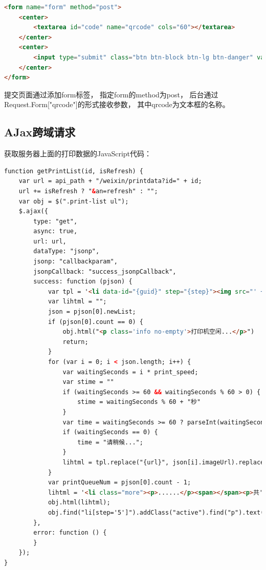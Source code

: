 \documentclass{book}
\begin{document}
\begin{lstlisting}[language=HTML]
<form name="form" method="post">
    <center>
        <textarea id="code" name="qrcode" cols="60"></textarea>
    </center>
    <center>
        <input type="submit" class="btn btn-block btn-lg btn-danger" value="点击验证" />
    </center>
</form>
\end{lstlisting}

提交页面通过添加form标签，
指定form的method为post，
后台通过Request.Form["qrcode"]的形式接收参数，
其中qrcode为文本框的名称。

\subsection{AJax跨域请求}

获取服务器上面的打印数据的JavaScript代码：

\begin{lstlisting}[language=HTML]
function getPrintList(id, isRefresh) {
	var url = api_path + "/weixin/printdata?id=" + id;
	url += isRefresh ? "&an=refresh" : "";
	var obj = $(".print-list ul");
	$.ajax({
	    type: "get",
	    async: true,
	    url: url,
	    dataType: "jsonp",
	    jsonp: "callbackparam",
	    jsonpCallback: "success_jsonpCallback",
	    success: function (pjson) {
	        var tpl = '<li data-id="{guid}" step="{step}"><img src="' + api_path + '{url}" /><span></span><p>{date}</p></li>';
	        var lihtml = "";
	        json = pjson[0].newList;
	        if (pjson[0].count == 0) {
	            obj.html("<p class='info no-empty'>打印机空闲...</p>")
	            return;
	        }
	        for (var i = 0; i < json.length; i++) {
	            var waitingSeconds = i * print_speed;
	            var stime = ""
	            if (waitingSeconds >= 60 && waitingSeconds % 60 > 0) {
	                stime = waitingSeconds % 60 + "秒"
	            }
	            var time = waitingSeconds >= 60 ? parseInt(waitingSeconds / 60) + "分" + stime + "后" : waitingSeconds + "秒后";
	            if (waitingSeconds == 0) {
	                time = "请稍候...";
	            }
	            lihtml = tpl.replace("{url}", json[i].imageUrl).replace("{date}", time).replace("{guid}", json[i].guid).replace("{step}", json[i].step) + lihtml;
	        }
	        var printQueueNum = pjson[0].count - 1;
	        lihtml = '<li class="more"><p>......</p><span></span><p>共' + printQueueNum + '人排队</p></li>' + lihtml;  
	        obj.html(lihtml);
	        obj.find("li[step='5']").addClass("active").find("p").text("正在打印...");
	    },
	    error: function () {
	    }
	});
}
\end{lstlisting}
\end{document}
